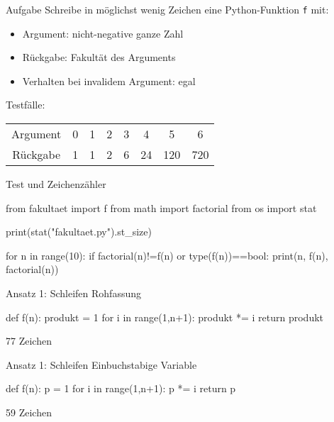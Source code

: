 \documentclass[xcolor=dvipsnames, aspectratio=169, 14pt]{beamer}
\begin{document}
\begin{frame}{Aufgabe}
	Schreibe in möglichst wenig Zeichen eine Python-Funktion \texttt{f} mit:
	\begin{itemize}
		\item Argument: nicht-negative ganze Zahl
		\item Rückgabe: Fakultät des Arguments
		\item Verhalten bei invalidem Argument: egal
	\end{itemize}
	
	\vfill
	
	Testfälle:\\[0.5\baselineskip]
	\setlength{\tabcolsep}{10pt}
	\renewcommand{\arraystretch}{1.3}
	\begin{tabular}{@{}c|ccccccc}
		Argument & 0 & 1 & 2 & 3 & 4 & 5 & 6 \\
		Rückgabe & 1 & 1 & 2 & 6 & 24 & 120 & 720
	\end{tabular}
\end{frame}

\begin{frame}[fragile]{Test und Zeichenzähler}
\vspace{-0.7\baselineskip}
\begin{python3code}
	from fakultaet import f
	from math import factorial
	from os import stat
	
	print(stat("fakultaet.py").st_size)
	
	for n in range(10):
		if factorial(n)!=f(n) or type(f(n))==bool:
			print(n, f(n), factorial(n))
\end{python3code}
\end{frame}

\begin{frame}[fragile]{Ansatz 1: Schleifen}
	Rohfassung
	
	\vfill
	
	\begin{python3code}
	def f(n):
	   produkt = 1
	   for i in range(1,n+1):
	      produkt *= i
	   return produkt
	\end{python3code}
	
	\vfill
	
	77 Zeichen
\end{frame}

\begin{frame}[fragile]{Ansatz 1: Schleifen}
	Einbuchstabige Variable\strut
	
	\vfill
	
	\begin{python3code}
	def f(n):
	   p = 1
	   for i in range(1,n+1):
	      p *= i
	   return p
	\end{python3code}
	
	\vfill
	
	59 Zeichen
\end{frame}
\end{document}

